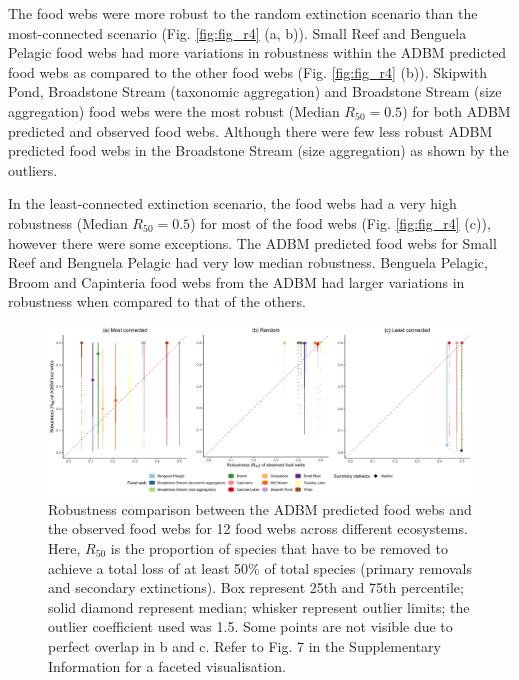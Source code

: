 \documentclass{article}
\begin{document}
The food webs were more robust to the random extinction scenario than
the most-connected scenario (Fig. \ref{fig:fig_r4} (a, b)). Small Reef
and Benguela Pelagic food webs had more variations in robustness within
the ADBM predicted food webs as compared to the other food webs (Fig.
\ref{fig:fig_r4} (b)). Skipwith Pond, Broadstone Stream (taxonomic
aggregation) and Broadstone Stream (size aggregation) food webs were the
most robust (Median \(R_{50} = 0.5\)) for both ADBM predicted and
observed food webs. Although there were few less robust ADBM predicted
food webs in the Broadstone Stream (size aggregation) as shown by the
outliers.

In the least-connected extinction scenario, the food webs had a very
high robustness (Median \(R_{50} = 0.5\)) for most of the food webs
(Fig. \ref{fig:fig_r4} (c)), however there were some exceptions. The
ADBM predicted food webs for Small Reef and Benguela Pelagic had very
low median robustness. Benguela Pelagic, Broom and Capinteria food webs
from the ADBM had larger variations in robustness when compared to that
of the others.

\begin{figure}

{\centering \includegraphics[width=450px]{../results/plot_R50_ADBM_vs_obs} 

}

\caption{\label{fig:fig_r4} Robustness comparison between the ADBM predicted food webs and the observed food webs for 12 food webs across different ecosystems. Here, $R_{50}$ is the proportion of species that have to be removed to achieve a total loss of at least 50\% of total species (primary removals and secondary extinctions). Box represent 25th and 75th percentile; solid diamond represent median; whisker represent outlier limits; the outlier coefficient used was 1.5. Some points are not visible due to perfect overlap in b and c. Refer to Fig. 7 in the Supplementary Information for a faceted visualisation.}\label{fig:unnamed-chunk-5}
\end{figure}
\end{document}
